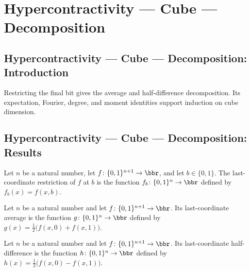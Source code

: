 \section{Hypercontractivity --- Cube --- Decomposition}
\subsection*{Hypercontractivity --- Cube --- Decomposition: Introduction}
Restricting the final bit gives the average and half-difference decomposition. Its expectation, Fourier, degree, and moment identities support induction on cube dimension.

\subsection*{Hypercontractivity --- Cube --- Decomposition: Results}

\begin{definition}
\leanok
{}
\label{BooleanAnalysis.Hypercontractivity.restrictLast}
Let $n$ be a natural number, let $f\colon\{0,1\}^{n+1}\to\bbr$, and let
$b\in\{0,1\}$. The last-coordinate restriction of $f$ at $b$ is the function
$f_b\colon\{0,1\}^n\to\bbr$ defined by $f_b(x)=f(x,b)$.
\end{definition}

\begin{definition}
\leanok
{}
\label{BooleanAnalysis.Hypercontractivity.avgLast}
Let $n$ be a natural number and let $f\colon\{0,1\}^{n+1}\to\bbr$. Its
last-coordinate average is the function $g\colon\{0,1\}^n\to\bbr$ defined by
$g(x)=\tfrac12\bigl(f(x,0)+f(x,1)\bigr)$.
\end{definition}

\begin{definition}
\leanok
{}
\label{BooleanAnalysis.Hypercontractivity.diffLast}
Let $n$ be a natural number and let $f\colon\{0,1\}^{n+1}\to\bbr$. Its
last-coordinate half-difference is the function $h\colon\{0,1\}^n\to\bbr$ defined by
$h(x)=\tfrac12\bigl(f(x,0)-f(x,1)\bigr)$.
\end{definition}

